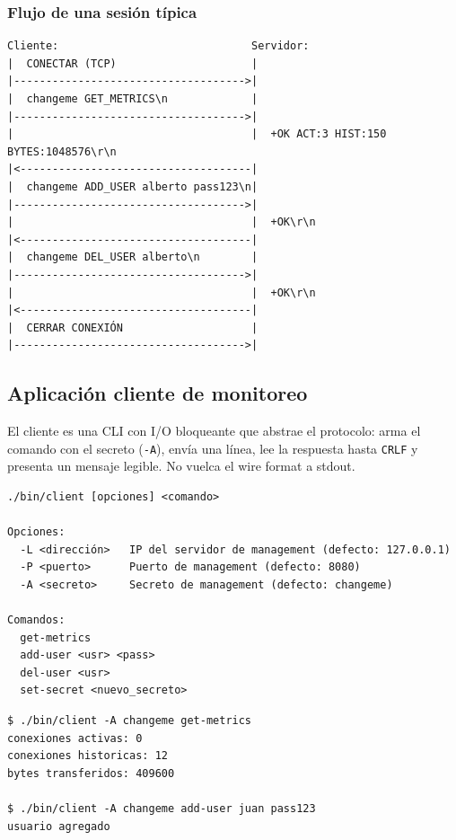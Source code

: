 \documentclass[12pt,a4paper]{article}
\begin{document}
\subsubsection{Flujo de una sesión típica}

\begin{lstlisting}[caption=Ejemplo de sesión de monitoreo]
Cliente:                              Servidor:
|  CONECTAR (TCP)                     |
|------------------------------------>|
|  changeme GET_METRICS\n             |
|------------------------------------>|
|                                     |  +OK ACT:3 HIST:150 BYTES:1048576\r\n
|<------------------------------------|
|  changeme ADD_USER alberto pass123\n|
|------------------------------------>|
|                                     |  +OK\r\n
|<------------------------------------|
|  changeme DEL_USER alberto\n        |
|------------------------------------>|
|                                     |  +OK\r\n
|<------------------------------------|
|  CERRAR CONEXIÓN                    |
|------------------------------------>|
\end{lstlisting}

\subsection{Aplicación cliente de monitoreo}

El cliente es una CLI con I/O bloqueante que abstrae el protocolo: arma el comando
con el secreto (\texttt{-A}), envía una línea, lee la respuesta hasta \texttt{CRLF}
y presenta un mensaje legible. No vuelca el wire format a stdout.

\begin{lstlisting}[caption=Uso del cliente de monitoreo]
./bin/client [opciones] <comando>

Opciones:
  -L <dirección>   IP del servidor de management (defecto: 127.0.0.1)
  -P <puerto>      Puerto de management (defecto: 8080)
  -A <secreto>     Secreto de management (defecto: changeme)

Comandos:
  get-metrics
  add-user <usr> <pass>
  del-user <usr>
  set-secret <nuevo_secreto>
\end{lstlisting}

\begin{lstlisting}[caption=Ejemplos del cliente]
$ ./bin/client -A changeme get-metrics
conexiones activas: 0
conexiones historicas: 12
bytes transferidos: 409600

$ ./bin/client -A changeme add-user juan pass123
usuario agregado
\end{lstlisting}
\end{document}
